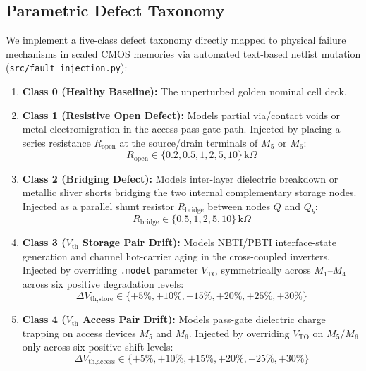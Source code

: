 \documentclass[conference]{IEEEtran}
\begin{document}
\subsection{Parametric Defect Taxonomy}
We implement a five-class defect taxonomy directly mapped to physical failure mechanisms in scaled CMOS memories via automated text-based netlist mutation (\texttt{src/fault\_injection.py}):
\begin{enumerate}
    \item \textbf{Class 0 (Healthy Baseline):} The unperturbed golden nominal cell deck.
    \item \textbf{Class 1 (Resistive Open Defect):} Models partial via/contact voids or metal electromigration in the access pass-gate path. Injected by placing a series resistance $R_{\text{open}}$ at the source/drain terminals of $M_5$ or $M_6$:
    \begin{equation}
    R_{\text{open}} \in \{0.2, 0.5, 1, 2, 5, 10\}\,\text{k}\Omega
    \end{equation}
    \item \textbf{Class 2 (Bridging Defect):} Models inter-layer dielectric breakdown or metallic sliver shorts bridging the two internal complementary storage nodes. Injected as a parallel shunt resistor $R_{\text{bridge}}$ between nodes $Q$ and $Q_b$:
    \begin{equation}
    R_{\text{bridge}} \in \{0.5, 1, 2, 5, 10\}\,\text{k}\Omega
    \end{equation}
    \item \textbf{Class 3 ($V_{\text{th}}$ Storage Pair Drift):} Models NBTI/PBTI interface-state generation and channel hot-carrier aging in the cross-coupled inverters. Injected by overriding \texttt{.model} parameter $V_{\text{TO}}$ symmetrically across $M_1$–$M_4$ across six positive degradation levels:
    \begin{equation}
    \Delta V_{\text{th,store}} \in \{+5\%, +10\%, +15\%, +20\%, +25\%, +30\%\}
    \end{equation}
    \item \textbf{Class 4 ($V_{\text{th}}$ Access Pair Drift):} Models pass-gate dielectric charge trapping on access devices $M_5$ and $M_6$. Injected by overriding $V_{\text{TO}}$ on $M_5/M_6$ only across six positive shift levels:
    \begin{equation}
    \Delta V_{\text{th,access}} \in \{+5\%, +10\%, +15\%, +20\%, +25\%, +30\%\}
    \end{equation}
\end{enumerate}
\end{document}
